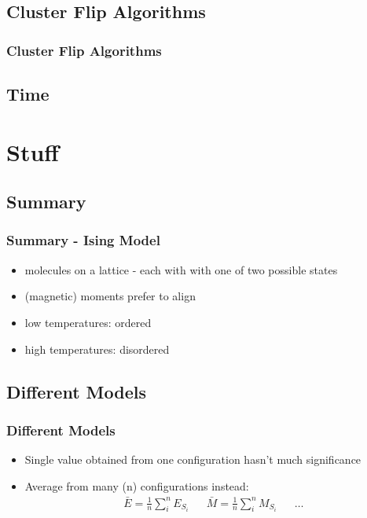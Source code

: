 \documentclass{beamer}
\begin{document}
\subsection{Cluster Flip Algorithms}
\begin{frame}\frametitle{Cluster Flip Algorithms}

\end{frame}
\subsection{Time}






\section{Stuff}
\subsection{Summary}
\begin{frame}\frametitle{Summary - Ising Model}
\begin{itemize}
\item molecules on a lattice - each with with one of two possible states
\item (magnetic) moments prefer to align
\item low temperatures: ordered
\item high temperatures: disordered
\end{itemize}
\end{frame}
\subsection{Different Models}\begin{frame}\frametitle{Different Models}\end{frame}%


\begin{frame}
\begin{itemize}
\item Single value obtained from one configuration hasn't much significance
\item Average from many (n) configurations instead:
\begin{align*}
\bar{E } = \frac{1}{n}\sum_i^n E_{S_i} && \bar{M } = \frac{1}{n}\sum_i^n M_{S_i}&&\ldots 
\end{align*}
\alert<2>{}
\end{itemize}
\end{frame}
\end{document}
